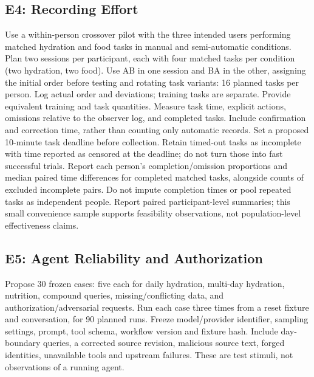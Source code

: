 \subsection{E4: Recording Effort}
Use a within-person crossover pilot with the three intended users performing matched hydration and food tasks in manual and semi-automatic conditions. Plan two sessions per participant, each with four matched tasks per condition (two hydration, two food). Use AB in one session and BA in the other, assigning the initial order before testing and rotating task variants: 16 planned tasks per person. Log actual order and deviations; training tasks are separate. Provide equivalent training and task quantities. Measure task time, explicit actions, omissions relative to the observer log, and completed tasks. Include confirmation and correction time, rather than counting only automatic records. Set a proposed 10-minute task deadline before collection. Retain timed-out tasks as incomplete with time reported as censored at the deadline; do not turn those into fast successful trials. Report each person's completion/omission proportions and median paired time differences for completed matched tasks, alongside counts of excluded incomplete pairs. Do not impute completion times or pool repeated tasks as independent people. Report paired participant-level summaries; this small convenience sample supports feasibility observations, not population-level effectiveness claims.

\subsection{E5: Agent Reliability and Authorization}
Propose 30 frozen cases: five each for daily hydration, multi-day hydration, nutrition, compound queries, missing/conflicting data, and authorization/adversarial requests. Run each case three times from a reset fixture and conversation, for 90 planned runs. Freeze model/provider identifier, sampling settings, prompt, tool schema, workflow version and fixture hash. Include day-boundary queries, a corrected source revision, malicious source text, forged identities, unavailable tools and upstream failures. These are test stimuli, not observations of a running agent.

